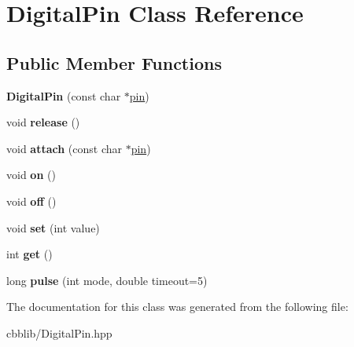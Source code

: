 \hypertarget{classDigitalPin}{\section{\-Digital\-Pin \-Class \-Reference}
\label{classDigitalPin}
}
\subsection*{\-Public \-Member \-Functions}
\begin{DoxyCompactItemize}
\item 
\hypertarget{classDigitalPin_ad1f5b1e4b3db82f8be062e7fa0b833f3}{{\bfseries \-Digital\-Pin} (const char $\ast$\hyperlink{structpin}{pin})}\label{classDigitalPin_ad1f5b1e4b3db82f8be062e7fa0b833f3}

\item 
\hypertarget{classDigitalPin_a5b5594738e897e34ef197eed41d4ca74}{void {\bfseries release} ()}\label{classDigitalPin_a5b5594738e897e34ef197eed41d4ca74}

\item 
\hypertarget{classDigitalPin_a1e15e9eacdb8490ea863f758176e7fb4}{void {\bfseries attach} (const char $\ast$\hyperlink{structpin}{pin})}\label{classDigitalPin_a1e15e9eacdb8490ea863f758176e7fb4}

\item 
\hypertarget{classDigitalPin_a5e0445c75b034c779cb78f580429afde}{void {\bfseries on} ()}\label{classDigitalPin_a5e0445c75b034c779cb78f580429afde}

\item 
\hypertarget{classDigitalPin_a657d33b5d27fdc86b0ec1428c2637c48}{void {\bfseries off} ()}\label{classDigitalPin_a657d33b5d27fdc86b0ec1428c2637c48}

\item 
\hypertarget{classDigitalPin_a6f31c669d4a2052dc7717ef77122094b}{void {\bfseries set} (int value)}\label{classDigitalPin_a6f31c669d4a2052dc7717ef77122094b}

\item 
\hypertarget{classDigitalPin_a642382ef1ff291d7d29a165f9a8d6c49}{int {\bfseries get} ()}\label{classDigitalPin_a642382ef1ff291d7d29a165f9a8d6c49}

\item 
\hypertarget{classDigitalPin_a7bdb9eeadb33d9ef6ccdec41218f8403}{long {\bfseries pulse} (int mode, double timeout=5)}\label{classDigitalPin_a7bdb9eeadb33d9ef6ccdec41218f8403}

\end{DoxyCompactItemize}


\-The documentation for this class was generated from the following file\-:\begin{DoxyCompactItemize}
\item 
cbblib/\-Digital\-Pin.\-hpp\end{DoxyCompactItemize}
